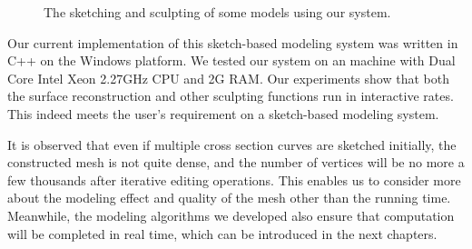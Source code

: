 \begin{figure} [htbp]
  \caption{The sketching and sculpting of some models using our system.}
  \label{fig:models:combine} %
\end{figure}

Our current implementation of this sketch-based modeling system was
written  in C++ on the Windows platform. We tested our system on an
machine with Dual Core Intel Xeon 2.27GHz CPU and 2G RAM. Our
experiments show that both the surface reconstruction and other
sculpting functions run in interactive rates. This indeed meets the
user's requirement on a sketch-based modeling system.

It is observed that even if multiple cross section curves are
sketched initially, the constructed mesh is not quite dense, and
the number of vertices will be no more a few thousands after
iterative editing operations. This enables us to consider more about
the modeling effect and quality of the mesh other than the running
time. Meanwhile, the modeling algorithms we developed also ensure
that computation will be completed in real time, which can be
introduced in the next chapters.


